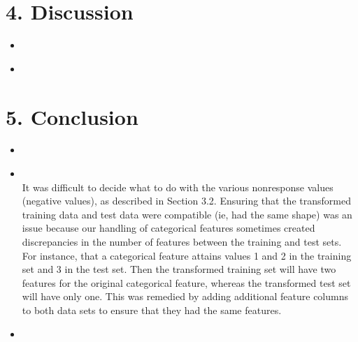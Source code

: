 \newpage

\section*{4. Discussion}
\medskip
\begin{itemize}

    \item {} \\

    \item {} \\

\end{itemize}



\section*{5. Conclusion}
\medskip
\begin{itemize}

    \item {} \\

    \item {} \\
    It was difficult to decide what to do with the various nonresponse values (negative values), as described in Section 3.2. Ensuring that the transformed training data and test data were compatible (ie, had the same shape) was an issue because our handling of categorical features sometimes created discrepancies in the number of features between the training and test sets. For instance, that a categorical feature attains values 1 and 2 in the training set and 3 in the test set. Then the transformed training set will have two features for the original categorical feature, whereas the transformed test set will have only one. This was remedied by adding additional feature columns to both data sets to ensure that they had the same features.

    \item {} \\

\end{itemize}




